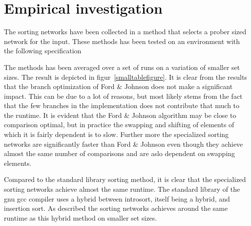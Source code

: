 \section{Empirical investigation}
The sorting networks have been collected in a method that selects a prober sized network for the input. These methods has been tested on an environment with the following specification


The methods has been averaged over a set of runs on a variation of smaller set sizes. The result is depicted in figur~\ref{smalltablefigure}. It is clear from the results that the branch optimization of Ford \& Johnson does not make a significant impact. This can be due to a lot of reasons, but most likely stems from the fact that the few branches in the implementation does not contribute that much to the runtime. It is evident that the Ford \& Johnson algorithm may be close to comparison optimal, but in practice the swapping and shifting of elements of which it is fairly dependent is to slow. Further more the specialized sorting networks are significantly faster than Ford \& Johnson even though they achieve almost the same number of comparisons and are aslo dependent on swapping elements.

Compared to the standard library sorting method, it is clear that the specialized sorting networks achieve almost the same runtime. The standard library of the gnu gcc compiler uses a hybrid between introsort, itself being a hybrid, and insertion sort. As described the sorting networks achieves around the same runtime as this hybrid method on smaller set sizes.


